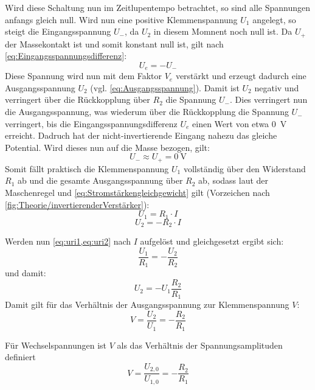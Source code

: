 Wird diese Schaltung nun im Zeitlupentempo betrachtet, so sind alle Spannungen
anfangs gleich null. Wird nun eine positive Klemmenspannung $U_1$ angelegt, so
steigt die Eingangsspannung $U_-$, da $U_2$ in diesem Momnent noch null ist.
Da $U_+$ der Massekontakt ist und somit konstant null ist, gilt nach
\cref{eq:Eingangsspannungsdifferenz}:
\begin{equation}
	U_e = - U_-
\end{equation}
Diese Spannung wird nun mit dem Faktor $V_e$ verstärkt und erzeugt dadurch eine
Ausgangsspannung $U_2$ (vgl. \cref{eq:Ausgangsspannung}). Damit ist $U_2$ 
negativ und verringert über die Rückkopplung über $R_2$ die Spannung $U_-$. Dies
verringert nun die Ausgangsspannung, was wiederum über die Rückkopplung die
Spannung $U_-$ verringert, bis die Eingangsspannungsdifferenz $U_e$ einen Wert
von etwa \qty{0}{\V} erreicht. Dadruch hat der nicht-invertierende Eingang 
nahezu das gleiche Potential. Wird dieses nun auf die Masse bezogen, gilt:
\begin{equation}
	U_- \approx U_+ = \qty{0}{\V}
\end{equation}
Somit fällt praktisch die Klemmenspannung $U_1$ vollständig über den Widerstand
$R_1$ ab und die gesamte Ausgangsspannung über $R_2$ ab, sodass laut der
Maschenregel und \cref{eq:Stromstärkengleichgewicht} gilt (Vorzeichen nach 
\cref{fig:Theorie/invertierenderVerstärker}):
\begin{equation}\label{eq:uri1}
	U_1 = R_1 \cdot I
\end{equation}
\begin{equation}\label{eq:uri2}
	U_2 = - R_2 \cdot I
\end{equation}

Werden nun \cref{eq:uri1,eq:uri2} nach $I$ aufgelöst und gleichgesetzt ergibt
sich:
\begin{equation}
	\dfrac{U_1}{R_1} = -\dfrac{U_2}{R_2}
\end{equation}
und damit:
\begin{equation}
	U_2 = - U_1 \dfrac{R_2}{R_1}
\end{equation}
Damit gilt für das Verhältnis der Ausgangsspannung zur Klemmenspannung $V$:
\begin{equation}\label{eq:Klemmenspannung}
	V = \dfrac{U_2}{U_1} = - \dfrac{R_2}{R_1}
\end{equation}

Für Wechselspannungen ist $V$ als das Verhältnis der Spannungsamplituden 
definiert
\begin{equation}\label{eq:KlemmenspannungAC}
	V = \dfrac{U_{2,0}}{U_{1,0}} = - \dfrac{R_2}{R_1}
\end{equation}

